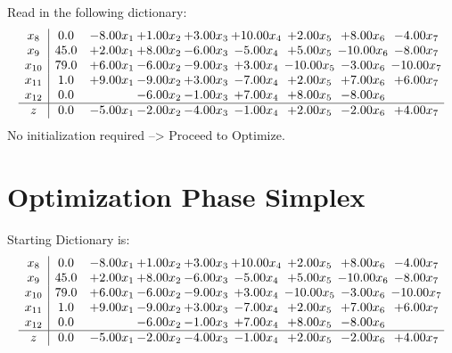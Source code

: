 \documentclass[9pt]{article}
\begin{document}
Read in the following dictionary:
\[\begin{array}{c| c c@{\hskip 2pt} c@{\hskip 2pt} c@{\hskip 2pt} c@{\hskip 2pt} c@{\hskip 2pt} c@{\hskip 2pt} c@{\hskip 2pt} }
 x_{8}   &  0.0 & -8.00 x_{1} & +  1.00 x_{2} & +  3.00 x_{3} & + 10.00 x_{4} & +  2.00 x_{5} & +  8.00 x_{6} & -4.00 x_{7}\\
 x_{9}   &  45.0 & +  2.00 x_{1} & +  8.00 x_{2} & -6.00 x_{3} & -5.00 x_{4} & +  5.00 x_{5} & -10.00 x_{6} & -8.00 x_{7}\\
 x_{10}   &  79.0 & +  6.00 x_{1} & -6.00 x_{2} & -9.00 x_{3} & +  3.00 x_{4} & -10.00 x_{5} & -3.00 x_{6} & -10.00 x_{7}\\
 x_{11}   &  1.0 & +  9.00 x_{1} & -9.00 x_{2} & +  3.00 x_{3} & -7.00 x_{4} & +  2.00 x_{5} & +  7.00 x_{6} & +  6.00 x_{7}\\
 x_{12}   &  0.0  &   & -6.00 x_{2} & -1.00 x_{3} & +  7.00 x_{4} & +  8.00 x_{5} & -8.00 x_{6} &   \\
\hline
z    &  0.0 & -5.00 x_{1} & -2.00 x_{2} & -4.00 x_{3} & -1.00 x_{4} & +  2.00 x_{5} & -2.00 x_{6} & +  4.00 x_{7}\\
\end{array}\]
No initialization required --> Proceed to Optimize. 
\section{Optimization Phase Simplex}
Starting Dictionary is:
\[\begin{array}{c| c c@{\hskip 2pt} c@{\hskip 2pt} c@{\hskip 2pt} c@{\hskip 2pt} c@{\hskip 2pt} c@{\hskip 2pt} c@{\hskip 2pt} }
 x_{8}   &  0.0 & -8.00 x_{1} & +  1.00 x_{2} & +  3.00 x_{3} & + 10.00 x_{4} & +  2.00 x_{5} & +  8.00 x_{6} & -4.00 x_{7}\\
 x_{9}   &  45.0 & +  2.00 x_{1} & +  8.00 x_{2} & -6.00 x_{3} & -5.00 x_{4} & +  5.00 x_{5} & -10.00 x_{6} & -8.00 x_{7}\\
 x_{10}   &  79.0 & +  6.00 x_{1} & -6.00 x_{2} & -9.00 x_{3} & +  3.00 x_{4} & -10.00 x_{5} & -3.00 x_{6} & -10.00 x_{7}\\
 x_{11}   &  1.0 & +  9.00 x_{1} & -9.00 x_{2} & +  3.00 x_{3} & -7.00 x_{4} & +  2.00 x_{5} & +  7.00 x_{6} & +  6.00 x_{7}\\
 x_{12}   &  0.0  &   & -6.00 x_{2} & -1.00 x_{3} & +  7.00 x_{4} & +  8.00 x_{5} & -8.00 x_{6} &   \\
\hline
z    &  0.0 & -5.00 x_{1} & -2.00 x_{2} & -4.00 x_{3} & -1.00 x_{4} & +  2.00 x_{5} & -2.00 x_{6} & +  4.00 x_{7}\\
\end{array}\]
\end{document}
